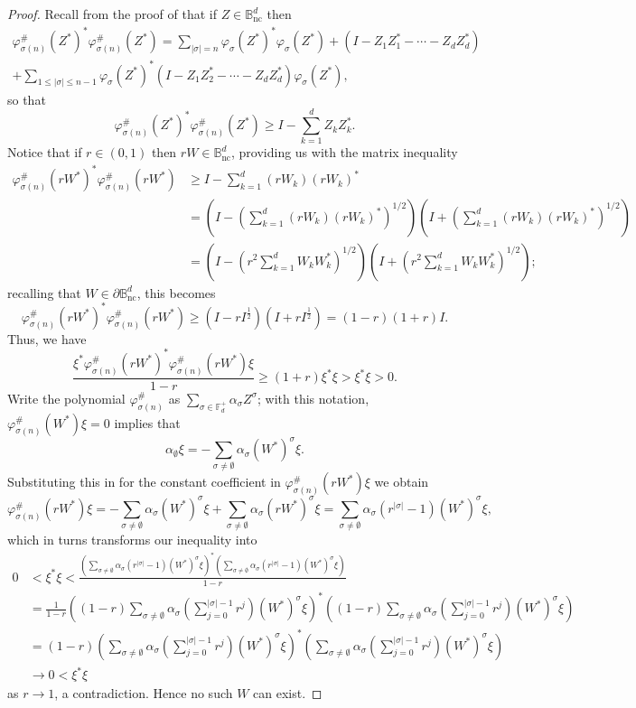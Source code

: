 \documentclass[10pt,a4paper]{amsart}
\def\BB{\mathbb{B}}
\def\FF{\mathbb{F}}
\def\a{\alpha}
\def\nc{\mathrm{nc}}
\def\p{\varphi}
\def\s{\sigma}
\begin{document}
\begin{proof}
    Recall from the proof of  that if \(Z \in \BB^d_\nc\) then
    \begin{multline*}
        \p_{\s(n)}^\#(Z^*)^* \p_{\s(n)}^\#(Z^*) = \sum_{\lvert \s \rvert = n} \p_\s(Z^*)^* \p_\s(Z^*) + (I - Z_1Z_1^* - \cdots - Z_dZ_d^*)  \\ + \sum_{1 \leq \lvert \s \rvert \leq n-1} \p_\s(Z^*)^*(I - Z_1Z_2^* - \cdots - Z_dZ_d^*)\p_\s(Z^*),
    \end{multline*}
    so that
    \[
        \p_{\s(n)}^\#(Z^*)^* \p_{\s(n)}^\#(Z^*) \geq I - \sum_{k=1}^d Z_kZ_k^*.
    \]
    Notice that if \(r \in (0,1)\) then \(rW \in \BB^d_\nc\), providing us with the matrix inequality
    \begin{align*}
        \p_{\s(n)}^\#(rW^*)^* \p_{\s(n)}^\#(rW^*) & \geq I - \sum_{k=1}^d (rW_k)(rW_k)^* \\
        & = \left(I - \left(\sum_{k=1}^d (rW_k)(rW_k)^*\right)^{1/2}\right)\left(I + \left(\sum_{k=1}^d (rW_k)(rW_k)^*\right)^{1/2}\right) \\
        & = \left(I - \left(r^2\sum_{k=1}^d W_kW_k^*\right)^{1/2}\right)\left(I + \left(r^2\sum_{k=1}^d W_kW_k^*\right)^{1/2}\right);
    \end{align*}
    recalling that \(W \in \partial \BB^d_\nc\), this becomes
    \[
        \p_{\s(n)}^\#(rW^*)^* \p_{\s(n)}^\#(rW^*) \geq (I - rI^{\frac12})(I + rI^{\frac12}) = (1-r)(1+r)I.
    \]
Thus, we have
    \[
        \frac{\xi^* \p_{\s(n)}^\#(rW^*)^* \p_{\s(n)}^\#(rW^*) \xi}{1-r} \geq (1+r)\xi^* \xi > \xi^* \xi > 0.
    \]
    Write the polynomial \(\p_{\s(n)}^\#\) as \(\sum_{\s \in \FF_d^+} \a_\s Z^\s\); with this notation, \(\p_{\s(n)}^\#(W^*)\xi = 0\) implies that 
    \[
        \a_\emptyset \xi = - \sum_{\s \neq \emptyset} \a_\s (W^*)^\s \xi.
    \]
    Substituting this in for the constant coefficient in \(\p_{\s(n)}^\#(rW^*)\xi\) we obtain
    \[
        \p_{\s(n)}^\#(rW^*)\xi = - \sum_{\s \neq \emptyset} \a_\s (W^*)^\s \xi + \sum_{\s \neq \emptyset} \a_\s (rW^*)^\s \xi = \sum_{\s\neq\emptyset} \a_\s (r^{\lvert \s \rvert} - 1) (W^*)^{\s} \xi,
    \]
    which in turns transforms our inequality into
    \begin{align*}
        0 & < \xi^* \xi < \frac{\left(\sum_{\s\neq\emptyset} \a_\s (r^{\lvert \s \rvert} - 1) (W^*)^{\s} \xi\right)^*\left(\sum_{\s\neq\emptyset} \a_\s (r^{\lvert \s \rvert} - 1) (W^*)^{\s} \xi\right)}{1-r} \\
        & = \frac{1}{1-r}\left((1-r)\sum_{\s\neq\emptyset} \a_\s \left(\sum_{j=0}^{\lvert \s \rvert - 1} r^j \right) (W^*)^{\s} \xi\right)^*\left((1-r)\sum_{\s\neq\emptyset} \a_\s \left(\sum_{j=0}^{\lvert \s \rvert - 1} r^j \right) (W^*)^{\s} \xi\right) \\
        & = (1-r)\left(\sum_{\s\neq\emptyset} \a_\s \left(\sum_{j=0}^{\lvert \s \rvert - 1} r^j \right) (W^*)^{\s} \xi\right)^*\left(\sum_{\s\neq\emptyset} \a_\s \left(\sum_{j=0}^{\lvert \s \rvert - 1} r^j \right) (W^*)^{\s} \xi\right) \\
        & \to 0 < \xi^*\xi
    \end{align*}
    as \(r \to 1\), a contradiction. Hence no such \(W\) can exist.
\end{proof}
\end{document}
